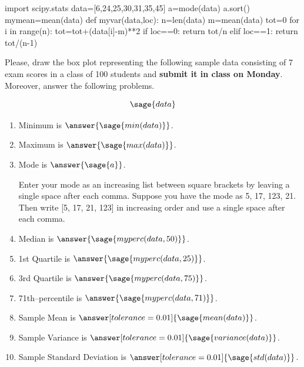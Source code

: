 \documentclass{ximera}
\begin{document}
\begin{problem}
\begin{sagesilent}
import scipy.stats
data=[6,24,25,30,31,35,45]
a=mode(data)
a.sort()
mymean=mean(data)
def myvar(data,loc):
    n=len(data)
    m=mean(data)
    tot=0
    for i in range(n):
        tot=tot+(data[i]-m)**2
    if loc==0:
        return tot/n
    elif loc==1:
        return tot/(n-1)
    
    
\end{sagesilent}
Please, draw the box plot representing the following sample data consisting of 7 exam scores in a class of 100 students and \textbf{submit it in class on Monday}. Moreover, answer the following problems.

$$\sage{data}$$

\begin{enumerate}
    \item Minimum is $\answer{\sage{min(data)}}$.
    \item Maximum is $\answer{\sage{max(data)}}$.
    \item Mode is $\answer{\sage{a}}$.
        \begin{hint}
        Enter your mode as an increasing list between square brackets by leaving a single space after each comma. 
        Suppose you have the mode as 5, 17, 123, 21. Then write {\color{red}[5, 17, 21, 123]} in increasing         order and use a single space after each comma.
        \end{hint}
    \item Median is $\answer{\sage{myperc(data,50)}}$.
    \item 1st Quartile is $\answer{\sage{myperc(data,25)}}$.
    \item 3rd Quartile is $\answer{\sage{myperc(data,75)}}$.
    \item 71th--percentile is $\answer{\sage{myperc(data,71)}}$.
    \item Sample Mean is $\answer[tolerance=0.01]{\sage{mean(data)}}$.
    \item Sample Variance is $\answer[tolerance=0.01]{\sage{variance(data)}}$.
    \item Sample Standard Deviation is $\answer[tolerance=0.01]{\sage{std(data)}}$.
\end{enumerate}
\end{problem}
\end{document}
